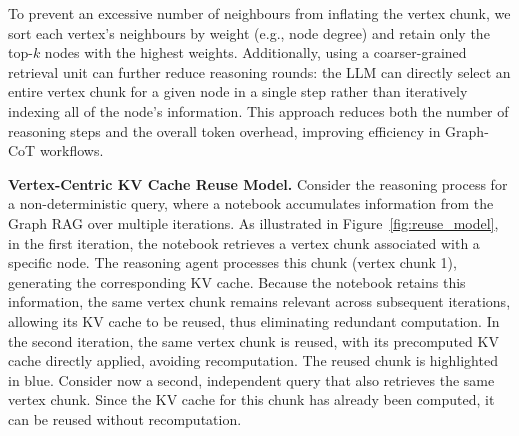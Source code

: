 To prevent an excessive number of neighbours from inflating the vertex chunk, we sort each vertex’s neighbours by weight (e.g., node degree) and retain only the top-$k$ nodes with the highest weights.  
Additionally, using a coarser-grained retrieval unit can further reduce reasoning rounds: the LLM can directly select an entire vertex chunk for a given node in a single step rather than iteratively indexing all of the node’s information.  
This approach reduces both the number of reasoning steps and the overall token overhead, improving efficiency in Graph-CoT workflows.


\textbf{Vertex-Centric KV Cache Reuse Model.}  
Consider the reasoning process for a non-deterministic query, where a notebook accumulates information from the Graph RAG over multiple iterations. As illustrated in Figure~\ref{fig:reuse_model}, in the first iteration, the notebook retrieves a vertex chunk associated with a specific node. The reasoning agent processes this chunk (vertex chunk 1), generating the corresponding KV cache. 
Because the notebook retains this information, the same vertex chunk remains relevant across subsequent iterations, allowing its KV cache to be reused, thus eliminating redundant computation. In the second iteration, the same vertex chunk is reused, with its precomputed KV cache directly applied, avoiding recomputation. The reused chunk is highlighted in blue.
Consider now a second, independent query that also retrieves the same vertex chunk. Since the KV cache for this chunk has already been computed, it can be reused without recomputation. 






